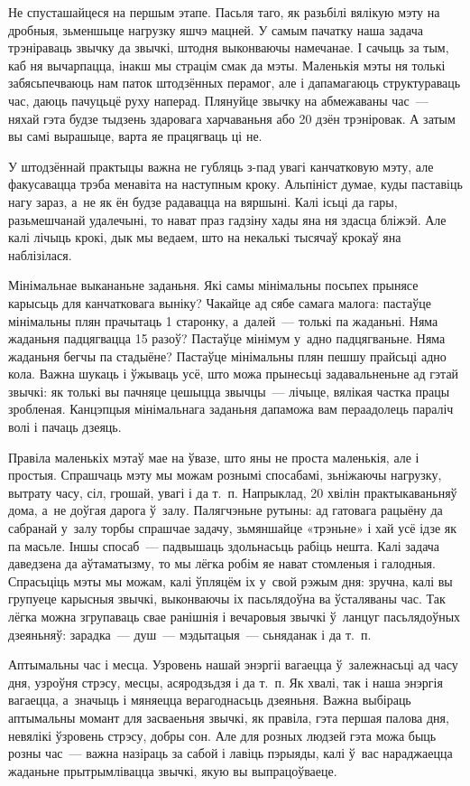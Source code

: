 Не спусташайцеся на першым этапе. Пасьля таго, як разьбілі вялікую мэту на дробныя, зьменшыце нагрузку яшчэ мацней. У самым пачатку наша задача трэніраваць звычку да звычкі, штодня выконваючы намечанае. І сачыць за тым, каб ня вычарпацца, інакш мы страцім смак да мэты. Маленькія мэты ня толькі забясьпечваюць нам паток штодзённых перамог, але і дапамагаюць структураваць час, даюць пачуцьцё руху наперад. Плянуйце звычку на абмежаваны час~--- няхай гэта будзе тыдзень здаровага харчаваньня або 20 дзён трэніровак. А затым вы самі вырашыце, варта яе працягваць ці не.

У штодзённай практыцы важна не губляць з-пад увагі канчатковую мэту, але факусавацца трэба менавіта на наступным кроку. Альпініст думае, куды паставіць нагу зараз, а~не як ён будзе радавацца на вяршыні. Калі ісьці да гары, разьмешчанай удалечыні, то нават праз гадзіну хады яна ня здасца бліжэй. Але калі лічыць крокі, дык мы ведаем, што на некалькі тысячаў крокаў яна наблізілася.

Мінімальнае выкананьне заданьня. Які самы мінімальны посьпех прынясе карысьць для канчатковага выніку? Чакайце ад сябе самага малога: пастаўце мінімальны плян прачытаць 1 старонку, а~далей~--- толькі па жаданьні. Няма жаданьня падцягвацца 15 разоў? Пастаўце мінімум у~адно падцягваньне. Няма жаданьня бегчы па стадыёне? Пастаўце мінімальны плян пешшу прайсьці адно кола. Важна шукаць і ўжываць усё, што можа прынесьці задавальненьне ад гэтай звычкі: як толькі вы пачняце цешыцца звычцы~--- лічыце, вялікая частка працы зробленая. Канцэпцыя мінімальнага заданьня дапаможа вам пераадолець параліч волі і пачаць дзеяць.

Правіла маленькіх мэтаў мае на ўвазе, што яны не проста маленькія, але і простыя. Спрашчаць мэту мы можам рознымі спосабамі, зьніжаючы нагрузку, вытрату часу, сіл, грошай, увагі і да т.~п. Напрыклад, 20 хвілін практыкаваньняў дома, а~не доўгая дарога ў~залу. Палягчэньне рутыны: ад гатовага рацыёну да сабранай у~залу торбы спрашчае задачу, зьмяншайце «трэньне» і хай усё ідзе як па масьле. Іншы спосаб~--- падвышаць здольнасьць рабіць нешта. Калі задача даведзена да аўтаматызму, то мы лёгка робім яе нават стомленыя і галодныя. Спрасьціць мэты мы можам, калі ўпляцём іх у~свой рэжым дня: зручна, калі вы групуеце карысныя звычкі, выконваючы іх пасьлядоўна ва ўсталяваны час. Так лёгка можна згрупаваць свае ранішнія і вечаровыя звычкі ў~ланцуг пасьлядоўных дзеяньняў: зарадка~--- душ~--- мэдытацыя~--- сьняданак і да т.~п.

Аптымальны час і месца. Узровень нашай энэргіі вагаецца ў~залежнасьці ад часу дня, узроўня стрэсу, месцы, асяродзьдзя і да т.~п. Як хвалі, так і наша энэргія вагаецца, а~значыць і мяняецца верагоднасьць дзеяньня. Важна выбіраць аптымальны момант для засваеньня звычкі, як правіла, гэта першая палова дня, невялікі ўзровень стрэсу, добры сон. Але для розных людзей гэта можа быць розны час~--- важна назіраць за сабой і лавіць пэрыяды, калі ў~вас нараджаецца жаданьне прытрымлівацца звычкі, якую вы выпрацоўваеце.

